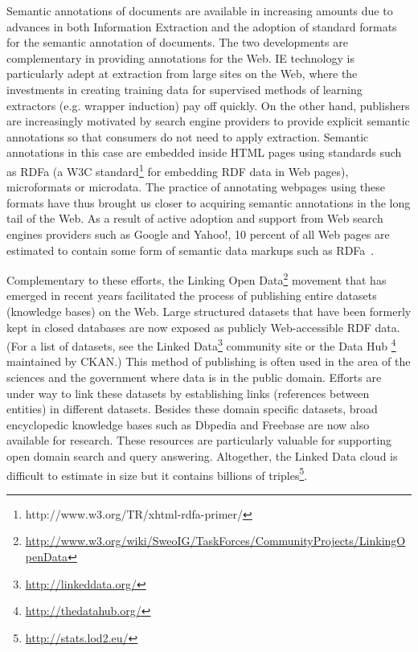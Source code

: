 Semantic annotations of documents are available in increasing amounts due to advances in both Information Extraction and the adoption of standard formats for the semantic annotation of documents. The two developments are complementary in providing annotations for the Web. IE technology is particularly adept at extraction from large sites on the Web, where the investments in creating training data for supervised methods of learning extractors (e.g. wrapper induction) pay off quickly. On the other hand, publishers are increasingly motivated by search engine providers to provide explicit semantic annotations so that consumers do not need to apply extraction. Semantic annotations in this case are embedded inside HTML pages using standards such as RDFa (a W3C standard\footnote{http://www.w3.org/TR/xhtml-rdfa-primer/} for embedding RDF data in Web pages), microformats or microdata. The practice of annotating webpages using these formats have thus brought us closer to acquiring semantic annotations in the long tail of the Web. As a result of active adoption and support from Web search engines providers such as Google and Yahoo!, 10 percent of all Web pages are estimated to contain some form of semantic data markups such as RDFa~\cite{DBLP:conf/semweb/MikaMZ09}. 

Complementary to these efforts, the Linking Open Data\footnote{\url{http://www.w3.org/wiki/SweoIG/TaskForces/CommunityProjects/LinkingOpenData}} movement that has emerged in recent years facilitated the process of publishing entire datasets (knowledge bases) on the Web. Large structured datasets that have been formerly kept in closed databases are now exposed as publicly Web-accessible RDF data. (For a list of datasets, see the Linked Data\footnote{\url{http://linkeddata.org/}} community site or the Data Hub \footnote{\url{http://thedatahub.org/}} maintained by CKAN.) This method of publishing is often used in the area of the sciences and the government where data is in the public domain. Efforts are under way to link these datasets by establishing links (references between entities) in different datasets. Besides these domain specific datasets, broad encyclopedic knowledge bases such as Dbpedia and Freebase are now also available for research. These resources are particularly valuable for supporting open domain search and query answering. Altogether, the Linked Data cloud is difficult to estimate in size but it contains billions of triples\footnote{\url{http://stats.lod2.eu/}}.

